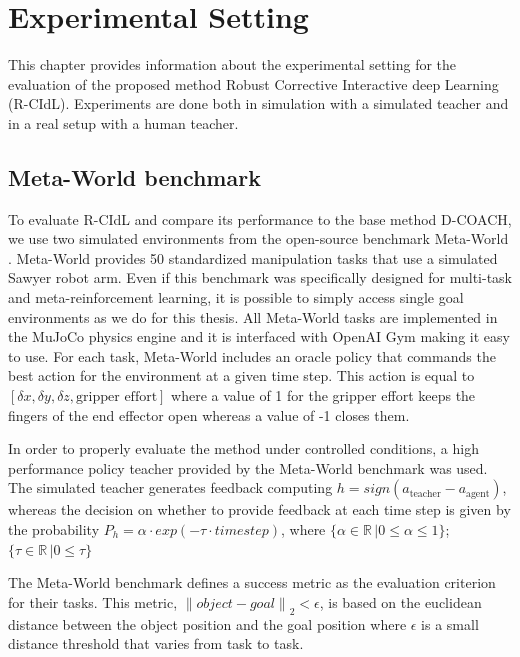 \chapter{Experimental Setting}
\label{chapter:Experimental Setting}

This chapter provides information about the experimental setting for the evaluation of the proposed method Robust Corrective Interactive deep Learning (R-CIdL). Experiments are done both in simulation with a simulated teacher and in a real setup with a human teacher.


\section{Meta-World benchmark}
\label{section:Meta-World Benchmark}
To evaluate R-CIdL and compare its performance to the base method D-COACH, we use two simulated environments from the open-source benchmark Meta-World \cite{metaworld}. Meta-World 
provides 50 standardized manipulation tasks that use a simulated Sawyer robot arm. Even if this benchmark was specifically designed for multi-task and meta-reinforcement learning, it is possible to simply access single goal environments as we do for this thesis. All Meta-World tasks are implemented in the MuJoCo physics engine \cite{mujoco} and it is interfaced with OpenAI Gym \cite{openai} making it easy to use. 
For each task, Meta-World includes an oracle policy that commands the best action for the environment at a given time step. This action is equal to 
$[\delta x, \delta y, \delta z, \textrm{gripper effort}]$
where a value of 1 for the gripper effort keeps the fingers of the end effector open whereas a value of -1 closes them.



In order to properly evaluate the method under controlled conditions, a high performance policy teacher provided by the Meta-World benchmark was used. The simulated teacher generates feedback computing $h = sign(a_\text{teacher} - a_\text{agent})$, whereas the decision on whether to provide feedback at each time step is given by the probability $P_h = \alpha \cdot exp(-\tau \cdot timestep)$, where $\{\alpha \in \mathbb{R}\, | 0 \leq \alpha \leq 1 \}$; $\{\tau \in \mathbb{R} \, | 0 \leq \tau\}$

The Meta-World benchmark defines a success metric as the evaluation criterion for their tasks. This metric, ${\left\lVert object-goal \right\rVert}_2 < \epsilon$, is based on the euclidean distance between the object position and the goal position where $\epsilon$ is a small distance threshold that varies from task to task.





